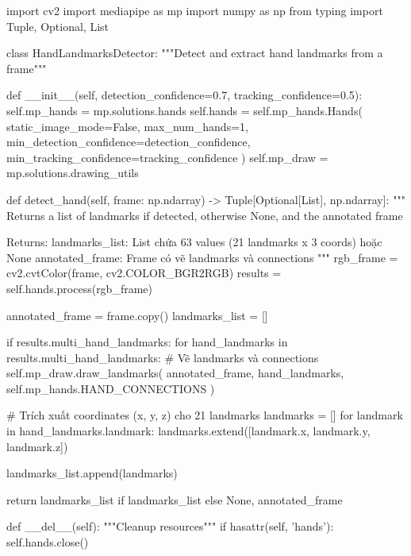 \begin{aivncodebox}
\begin{python}
import cv2
import mediapipe as mp
import numpy as np
from typing import Tuple, Optional, List

class HandLandmarksDetector:
    """Detect and extract hand landmarks from a frame"""
    
    def __init__(self, detection_confidence=0.7, tracking_confidence=0.5):
        self.mp_hands = mp.solutions.hands
        self.hands = self.mp_hands.Hands(
            static_image_mode=False,
            max_num_hands=1,
            min_detection_confidence=detection_confidence,
            min_tracking_confidence=tracking_confidence
        )
        self.mp_draw = mp.solutions.drawing_utils
    
    def detect_hand(self, frame: np.ndarray) -> Tuple[Optional[List], np.ndarray]:
        """
        Returns a list of landmarks if detected, otherwise None, and the annotated frame
        
        Returns:
            landmarks_list: List chứa 63 values (21 landmarks x 3 coords) hoặc None
            annotated_frame: Frame có vẽ landmarks và connections
        """
        rgb_frame = cv2.cvtColor(frame, cv2.COLOR_BGR2RGB)
        results = self.hands.process(rgb_frame)
        
        annotated_frame = frame.copy()
        landmarks_list = []
        
        if results.multi_hand_landmarks:
            for hand_landmarks in results.multi_hand_landmarks:
                # Vẽ landmarks và connections
                self.mp_draw.draw_landmarks(
                    annotated_frame, hand_landmarks, 
                    self.mp_hands.HAND_CONNECTIONS
                )
                
                # Trích xuất coordinates (x, y, z) cho 21 landmarks
                landmarks = []
                for landmark in hand_landmarks.landmark:
                    landmarks.extend([landmark.x, landmark.y, landmark.z])
                
                landmarks_list.append(landmarks)
        
        return landmarks_list if landmarks_list else None, annotated_frame
    
    def __del__(self):
        """Cleanup resources"""
        if hasattr(self, 'hands'):
            self.hands.close()
\end{python}
\end{aivncodebox}


